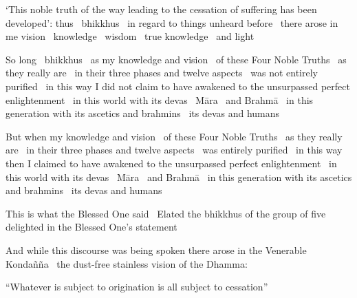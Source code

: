\begin{english-only-hang}
  `This noble truth of the way leading to the cessation of suffering has been developed': thus \breathmark\ bhikkhus \breathmark\ in regard to things unheard before \breathmark\ there arose in me vision \breathmark\ knowledge \breathmark\ wisdom \breathmark\ true knowledge \breathmark\ and light
\end{english-only-hang}

\begin{english-only-hang}
  So long \breathmark\ bhikkhus \breathmark\ as my knowledge and vision \breathmark\ of these Four Noble Truths \breathmark\ as they really are \breathmark\ in their three phases and twelve aspects \breathmark\ was not entirely purified \breathmark\ in this way I did not claim to have awakened to the unsurpassed perfect enlightenment \breathmark\ in this world with its devas \breathmark\ Māra \breathmark\ and Brahmā \breathmark\ in this generation with its ascetics and brahmins \breathmark\ its devas and humans
\end{english-only-hang}

\begin{english-only-hang}
  But when my knowledge and vision \breathmark\ of these Four Noble Truths \breathmark\ as they really are \breathmark\ in their three phases and twelve aspects \breathmark\ was entirely purified \breathmark\ in this way then I claimed to have awakened to the unsurpassed perfect enlightenment \breathmark\ in this world with its devas \breathmark\ Māra \breathmark\ and Brahmā \breathmark\ in this generation with its ascetics and brahmins \breathmark\ its devas and humans
\end{english-only-hang}

\begin{english-only-hang}
  This is what the Blessed One said \breathmark\ Elated the bhikkhus of the group of five delighted in the Blessed One's statement
\end{english-only-hang}

\begin{english-only-hang}
  And while this discourse was being spoken there arose in the Venerable Kondañña \breathmark\ the dust-free stainless vision of the Dhamma:
\end{english-only-hang}

\begin{english-only-hang}
  ``Whatever is subject to origination is all subject to cessation''
\end{english-only-hang}

